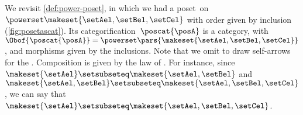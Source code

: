 \begin{example}
    We revisit \cref{def:power-poset}, in which we had a poset~\posA on $\powerset \makeset{\setAel,\setBel,\setCel}$ with order given by inclusion (\cref{fig:posetascat}).
    Its categorification~$\poscat{\posA}$ is a category, with $\Obof{\poscat{\posA}}=\powerset\pars{\makeset{\setAel,\setBel,\setCel}}$, and morphisms given by the inclusions.
    Note that we omit to draw self-arrows for the .
    Composition is given by the  law of .
    For instance, since~$\makeset{\setAel}\setsubseteq \makeset{\setAel,\setBel}$ and~$\makeset{\setAel,\setBel} \setsubseteq \makeset{\setAel,\setBel,\setCel}$, we can say that~$\makeset{\setAel}\setsubseteq \makeset{\setAel,\setBel,\setCel}$.
\end{example}